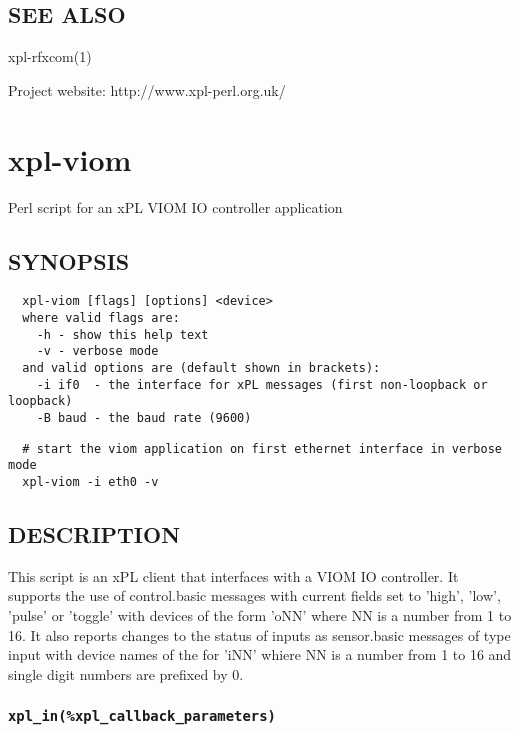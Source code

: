 \documentclass[12pt,a4paper]{article}
\begin{document}
\subsection*{SEE ALSO\label{xpl-tty-tcp_SEE_ALSO}}


xpl-rfxcom(1)



Project website: http://www.xpl-perl.org.uk/

\newpage
\section{xpl-viom\label{xpl-viom}}


Perl script for an xPL VIOM IO controller application

\subsection*{SYNOPSIS\label{xpl-viom_SYNOPSIS}}
\begin{verbatim}
  xpl-viom [flags] [options] <device>
  where valid flags are:
    -h - show this help text
    -v - verbose mode
  and valid options are (default shown in brackets):
    -i if0  - the interface for xPL messages (first non-loopback or loopback)
    -B baud - the baud rate (9600)
\end{verbatim}
\begin{verbatim}
  # start the viom application on first ethernet interface in verbose mode
  xpl-viom -i eth0 -v
\end{verbatim}
\subsection*{DESCRIPTION\label{xpl-viom_DESCRIPTION}}


This script is an xPL client that interfaces with a VIOM IO
controller.  It supports the use of control.basic messages with
current fields set to 'high', 'low', 'pulse' or 'toggle' with devices
of the form 'oNN' where NN is a number from 1 to 16.  It also reports
changes to the status of inputs as sensor.basic messages of type input
with device names of the for 'iNN' whiere NN is a number from 1 to 16
and single digit numbers are prefixed by 0.

\subsubsection*{\texttt{xpl\_in(\%xpl\_callback\_parameters)}\label{xpl-viom_xpl_in_xpl_callback_parameters_}}
\end{document}
